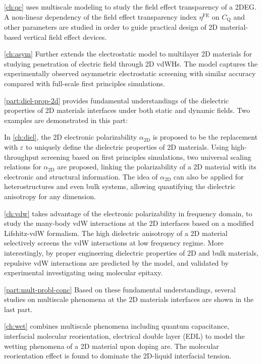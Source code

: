 \autoref{ch:qc} uses multiscale modeling to study the field effect
transparency of a 2DEG. A non-linear dependency of the field effect
transparency index $\eta^{\mathrm{FE}}$ on $C_{\mathrm{Q}}$ and other parameters are
studied in order to guide practical design of 2D material-based
vertical field effect devices.
%

\autoref{ch:asym} Further extends the electrostatic model to
multilayer 2D materials for studying penetration of electric field
through 2D vdWHs. The model captures the experimentally observed
asymmetric electrostatic screening with similar accuracy compared with
full-scale first principles simulations.

\autoref{part:diel-prop-2d} provides fundamental understandings of the
dielectric properties of 2D materials interfaces under both static and
dynamic fields. Two examples are demonstrated in this part:
%

In \autoref{ch:diel}, the 2D electronic polarizability
$\alpha_{\mathrm{2D}}$ is proposed to be the replacement with
$\varepsilon$ to uniquely define the dielectric properties of 2D
materials. Using high-throughput screening based on first principles
simulations, two universal scaling relations for
$\alpha_{\mathrm{2D}}$ are proposed, linking the polarizability of a
2D material with its electronic and structural information.
%
The idea
of $\alpha_{\mathrm{2D}}$ can also be applied for heterostructures
and even bulk systems, allowing quantifying the dielectric anisotropy
for any dimension.
%

\autoref{ch:vdw} takes advantage of the electronic polarizability
in frequency domain, to study the many-body vdW interactions at the 2D
interfaces based on a modified Lifshitz-vdW
formalism. The high dielectric anisotropy of a 2D material selectively
screens the vdW interactions at low frequency regime. More
interestingly, by proper engineering dielectric properties of 2D and
bulk materials, repulsive vdW interactions are predicted by the model,
and validated by experimental investigating using molecular epitaxy.

\autoref{part:mult-probl-conc} Based on these fundamental understandings, several
studies on multiscale phenomena at the 2D materials interfaces are
shown in the last part.
%

\autoref{ch:wet} combines multiscale phenomena including quantum capacitance,
interfacial molecular reorientation, electrical double layer (EDL) to model
the wetting phenomena of a 2D material upon doping are. The
molecular reorientation effect is found to dominate the 2D-liquid
interfacial tension.
%

